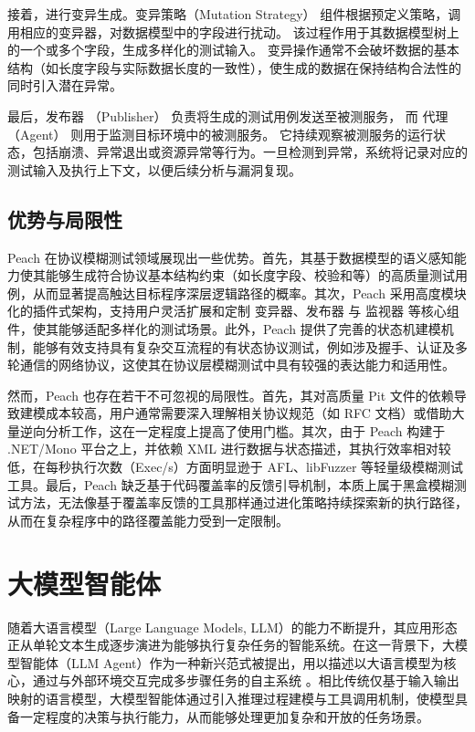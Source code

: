 接着，进行变异生成。变异策略（Mutation Strategy）
组件根据预定义策略，调用相应的变异器，对数据模型中的字段进行扰动。
该过程作用于其数据模型树上的一个或多个字段，生成多样化的测试输入。
变异操作通常不会破坏数据的基本结构（如长度字段与实际数据长度的一致性），使生成的数据在保持结构合法性的同时引入潜在异常。

最后，发布器 （Publisher）
负责将生成的测试用例发送至被测服务，
而 代理（Agent） 则用于监测目标环境中的被测服务。
它持续观察被测服务的运行状态，包括崩溃、异常退出或资源异常等行为。一旦检测到异常，系统将记录对应的测试输入及执行上下文，以便后续分析与漏洞复现。

\subsection{优势与局限性}

Peach 在协议模糊测试领域展现出一些优势。首先，其基于数据模型的语义感知能力使其能够生成符合协议基本结构约束（如长度字段、校验和等）的高质量测试用例，从而显著提高触达目标程序深层逻辑路径的概率。其次，Peach 采用高度模块化的插件式架构，支持用户灵活扩展和定制 变异器、发布器 与 监视器 等核心组件，使其能够适配多样化的测试场景。此外，Peach 提供了完善的状态机建模机制，能够有效支持具有复杂交互流程的有状态协议测试，例如涉及握手、认证及多轮通信的网络协议，这使其在协议层模糊测试中具有较强的表达能力和适用性。

然而，Peach 也存在若干不可忽视的局限性。首先，其对高质量 Pit 文件的依赖导致建模成本较高，用户通常需要深入理解相关协议规范（如 RFC 文档）或借助大量逆向分析工作，这在一定程度上提高了使用门槛。其次，由于 Peach 构建于 .NET/Mono 平台之上，并依赖 XML 进行数据与状态描述，其执行效率相对较低，在每秒执行次数（Exec/s）方面明显逊于 AFL、libFuzzer 等轻量级模糊测试工具。最后，Peach 缺乏基于代码覆盖率的反馈引导机制，本质上属于黑盒模糊测试方法，无法像基于覆盖率反馈的工具那样通过进化策略持续探索新的执行路径，从而在复杂程序中的路径覆盖能力受到一定限制。


\section{大模型智能体}

随着大语言模型（Large Language Models, LLM）的能力不断提升，其应用形态正从单轮文本生成逐步演进为能够执行复杂任务的智能系统。在这一背景下，大模型智能体（LLM Agent）作为一种新兴范式被提出，用以描述以大语言模型为核心，通过与外部环境交互完成多步骤任务的自主系统 \cite{yao2023react,schick2023toolformer}。相比传统仅基于输入输出映射的语言模型，大模型智能体通过引入推理过程建模与工具调用机制，使模型具备一定程度的决策与执行能力，从而能够处理更加复杂和开放的任务场景。


